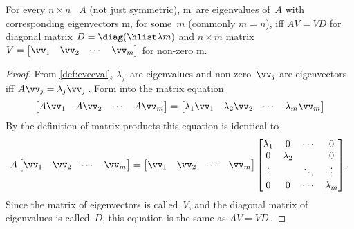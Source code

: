 \begin{theorem} \label{thm:avvd}
For every \(n\times n\) ~\(A\) (not just symmetric),
\hlist\lambda m\ are eigenvalues of~\(A\) with corresponding eigenvectors \hlist\vv m, for some~\(m\) (commonly \(m=n\)), iff \(AV=VD\) for diagonal matrix \(D=\diag(\hlist\lambda m)\) and \(n\times m\) matrix \(V=\begin{bmatrix} \vv_1&\vv_2&\cdots&\vv_m \end{bmatrix}\) for non-zero \hlist\vv m.
\end{theorem}

\begin{proof} 
From \autoref{def:evecval}, \(\lambda_j\)~are eigenvalues and non-zero~\(\vv_j\) are eigenvectors iff \(A\vv_j=\lambda_j\vv_j\)\,.
Form into the matrix equation
\begin{equation*}
\begin{bmatrix} A\vv_1&A\vv_2&\cdots&A\vv_m \end{bmatrix}
=\begin{bmatrix} \lambda_1\vv_1&\lambda_2\vv_2&\cdots&\lambda_m\vv_m \end{bmatrix}
\end{equation*}
By the definition of matrix products this equation is identical to
\begin{equation*}
A\begin{bmatrix} \vv_1&\vv_2&\cdots&\vv_m \end{bmatrix}
=\begin{bmatrix} \vv_1&\vv_2&\cdots&\vv_m \end{bmatrix}
\begin{bmatrix} \lambda_1&0&\cdots&0
\\0&\lambda_2&&0
\\\vdots&&\ddots&\vdots
\\0&0&\cdots&\lambda_m \end{bmatrix}.
\end{equation*}
Since the matrix of eigenvectors is called~\(V\), and the diagonal matrix of eigenvalues is called~\(D\), this equation is the same as \(AV=VD\)\,.
\end{proof}



